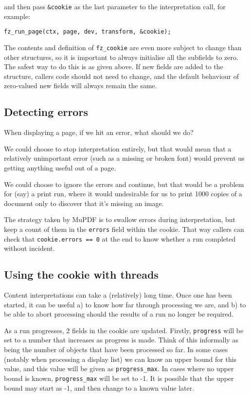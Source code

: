 \documentclass[oneside]{book}
\begin{document}
and then pass \texttt{\&cookie} as the last parameter to the interpretation call, for example:

\begin{lstlisting}
fz_run_page(ctx, page, dev, transform, &cookie);
\end{lstlisting}

The contents and definition of \texttt{fz\_cookie} are even more subject to change than other structures, so it is important to always initialise all the subfields to zero. The safest way to do this is as given above. If new fields are added to the structure, callers code should not need to change, and the default behaviour of zero-valued new fields will always remain the same.

\subsection{Detecting errors}

When displaying a page, if we hit an error, what should we do?

We could choose to stop interpretation entirely, but that would mean that a relatively unimportant error (such as a missing or broken font) would prevent us getting anything useful out of a page.

We could choose to ignore the errors and continue, but that would be a problem for (say) a print run, where it would undesirable for us to print 1000 copies of a document only to discover that it's missing an image.

The strategy taken by MuPDF is to swallow errors during interpretation, but keep a count of them in the \texttt{errors} field within the cookie. That way callers can check that \texttt{cookie.errors == 0} at the end to know whether a run completed without incident.


\subsection{Using the cookie with threads}

Content interpretations can take a (relatively) long time. Once one has been started, it can be useful a) to know how far through processing we are, and b) to be able to abort processing should the results of a run no longer be required.

As a run progresses, 2 fields in the cookie are updated. Firstly, \texttt{progress} will be set to a number that increases as progress is made. Think of this informally as being the number of objects that have been processed so far. In some cases (notably when processing a display list) we can know an upper bound for this value, and this value will be given as \texttt{progress\_max}. In cases where no upper bound is known, \texttt{progress\_max} will be set to -1. It is possible that the upper bound may start as -1, and then change to a known value later.
\end{document}
